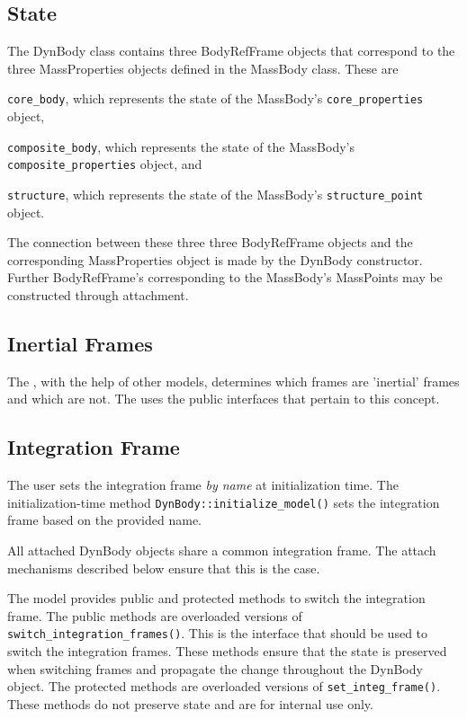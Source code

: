 \subsection{State}
The DynBody class contains three BodyRefFrame objects that correspond to the
three MassProperties objects defined in the MassBody class. These are
\begin{inparaenum}[(1)]
\item \verb+core_body+, which represents the state of the
  MassBody's \verb+core_properties+ object,
\item \verb+composite_body+, which represents the state of the
  MassBody's \verb+composite_properties+ object, and
\item \verb+structure+, which represents the state of the
  MassBody's \verb+structure_point+ object.
\end{inparaenum}
The connection between these three three BodyRefFrame objects and the
corresponding MassProperties object is made by the DynBody constructor. 
Further BodyRefFrame's corresponding to the MassBody's MassPoints may be 
constructed through attachment.

\subsection{Inertial Frames}
The \DYNMANAGER, with the help of other models, determines which frames
are 'inertial' frames and which are not. The \ModelDesc uses the
\DYNMANAGER public interfaces that pertain to this concept.

\subsection{Integration Frame}
The user sets the integration frame \emph{by name} at initialization time.
The initialization-time method \verb+DynBody::initialize_model()+ sets the
integration frame based on the provided name.

All attached DynBody objects share a common integration frame. The attach
mechanisms described below ensure that this is the case.

The model provides public and protected methods to switch the integration frame.
The public methods are overloaded versions of
\verb+switch_integration_frames()+. This is the interface that should
be used to switch the integration frames. These methods ensure that the
state is preserved when switching frames and propagate the change throughout
the DynBody object.
The protected methods are overloaded versions of \verb+set_integ_frame()+.
These methods do not preserve state and are for internal use only.

